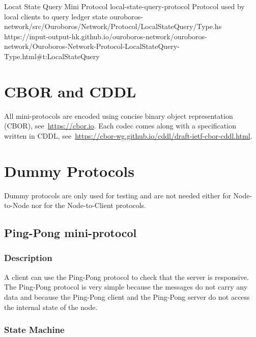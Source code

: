 \miniEntry
    {Locat State Query Mini Protocol}
    {local-state-query-protocol}
    {Protocol used by local clients to query ledger state}
    {ouroboros-network/src/Ouroboros/Network/Protocol/LocalStateQuery/Type.hs}
    {https://input-output-hk.github.io/ouroboros-network/ouroboros-network/Ouroboros-Network-Protocol-LocalStateQuery-Type.html\#t:LocalStateQuery}

\section{CBOR and CDDL}
All mini-protocols are encoded using concise binary object representation
(CBOR), see~\url{https://cbor.io}.  Each codec comes along with a specification
written in CDDL,
see~\url{https://cbor-wg.github.io/cddl/draft-ietf-cbor-cddl.html}.

\section{Dummy Protocols}
Dummy protocols are only used for testing and are not needed either for
Node-to-Node nor for the Node-to-Client protocols.
\subsection{Ping-Pong mini-protocol}
\label{ping-pong-protocol}
\newcommand{\Ping}{\msg{MsgPing}}
\newcommand{\Pong}{\msg{MsgPong}}


\subsubsection{Description}
A client can use the Ping-Pong protocol to check that the server is responsive.
The Ping-Pong protocol is very simple because the messages do not carry any data and
because the Ping-Pong client and the Ping-Pong server do not access the internal state of the node.

\subsubsection{State Machine}
\begin{figure}[h]
\end{figure}

